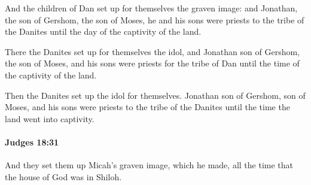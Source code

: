 			\begin{versebox}
					\item[BHS] 
					\item[ASV] And the children of Dan set up for themselves the graven image: and Jonathan, the son of Gershom, the son of Moses, he and his sons were priests to the tribe of the Danites until the day of the captivity of the land.
					\item[NIV] There the Danites set up for themselves the idol, and Jonathan son of Gershom, the son of Moses, and his sons were priests for the tribe of Dan until the time of the captivity of the land.
					\item[NRSV] Then the Danites set up the idol for themselves. Jonathan son of Gershom, son of Moses, and his sons were priests to the tribe of the Danites until the time the land went into captivity.
			\end{versebox}

		\paragraph{Judges 18:31} %
			\label{JUDGES-18-31}

			And they set them up Micah’s graven image, which he made, all the time that the house of God was in Shiloh.

